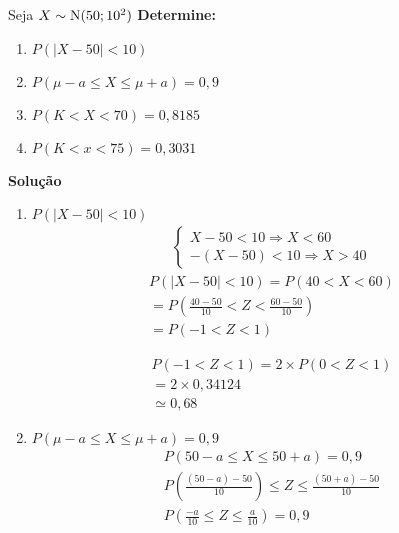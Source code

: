     \begin{example}Seja $X \sim \operatorname{N}(50; 10^2)$
      \textbf{Determine:}
          \begin{enumerate}[label=(\alph*)]
            \item $P(|X-50| <10)$
            \item $P( \mu-a \leq X \leq \mu +a )=0,9$
            \item $P(K< X <70)=0,8185$
            \item $P(K < x <75)= 0,3031$
          \end{enumerate}
          \textbf{Solução}
          \begin{enumerate}[label=(\alph*)]
            \item $P(|X-50| <10)$
              \begin{align*}
                \begin{cases}
                  X-50<10 \Rightarrow X<60 \\
                  -(X-50) <10 \Rightarrow X>40
                \end{cases}
              \end{align*}
              \begin{align*}
                P(|X-50| <10)  = P(40<X<60) \\
                = P(\frac{40-50}{10}< Z < \frac{60-50}{10}) \\
                = P(-1 < Z < 1)
              \end{align*} 
              \begin{figure}[H]
                \centering
                
                \label{fig:}
              \end{figure}
              \begin{figure}[H]
                \centering
                
                \label{fig:}
              \end{figure}

              \begin{align*}
                P(-1 < Z <1)  = 2 \times P(0 < Z <1) \\
                = 2 \times 0,34124 \\
                \simeq 0,68
              \end{align*}

            \item $P\left( \mu-a \leq X \leq \mu +a \right)=0,9$
              \begin{align*}
                P\left(50- a \leq X \leq 50 +a\right)  = 0,9 \\
                P\left(\frac{(50-a)-50}{10}\right) \leq Z \leq \frac{(50+a)-50}{10} \\
                P\left(\frac{-a}{10} \leq Z \leq \frac{a}{10}\right)=0,9 
              \end{align*}


\end{enumerate}
\end{example}
